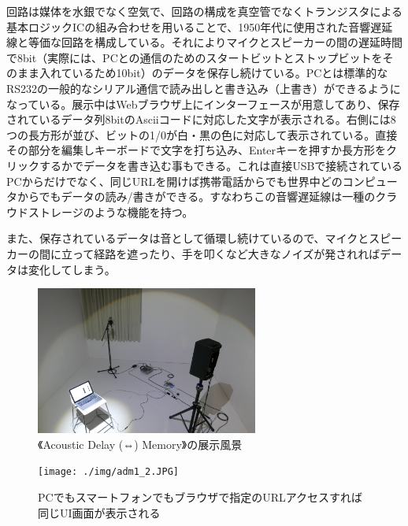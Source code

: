 \documentclass[a4paper,report]{jsbook}
\begin{document}
回路は媒体を水銀でなく空気で、回路の構成を真空管でなくトランジスタによる基本ロジックICの組み合わせを用いることで、1950年代に使用された音響遅延線と等価な回路を構成している。それによりマイクとスピーカーの間の遅延時間で8bit（実際には、PCとの通信のためのスタートビットとストップビットをそのまま入れているため10bit）のデータを保存し続けている。PCとは標準的なRS232の一般的なシリアル通信で読み出しと書き込み（上書き）ができるようになっている。展示中はWebブラウザ上にインターフェースが用意してあり、保存されているデータ列8bitのAsciiコードに対応した文字が表示される。右側には8つの長方形が並び、ビットの1/0が白・黒の色に対応して表示されている。直接その部分を編集しキーボードで文字を打ち込み、Enterキーを押すか長方形をクリックするかでデータを書き込む事もできる。これは直接USBで接続されているPCからだけでなく、同じURLを開けば携帯電話からでも世界中どのコンピュータからでもデータの読み/書きができる。すなわちこの音響遅延線は一種のクラウドストレージのような機能を持つ。

また、保存されているデータは音として循環し続けているので、マイクとスピーカーの間に立って経路を遮ったり、手を叩くなど大きなノイズが発されればデータは変化してしまう。

\begin{no-prefix-figure-caption}

\begin{figure}[htbp]
\centering
\includegraphics[width=0.65000\textwidth]{./img/adm1_1.JPG}
\caption{《Acoustic Delay (⇔) Memory》の展示風景}
\end{figure}

\end{no-prefix-figure-caption}

\begin{no-prefix-figure-caption}

\begin{figure}[htbp]
\centering
\texttt{[image: ./img/adm1\_2.JPG]}
\caption{PCでもスマートフォンでもブラウザで指定のURLアクセスすれば同じUI画面が表示される}
\end{figure}

\end{no-prefix-figure-caption}
\end{document}
